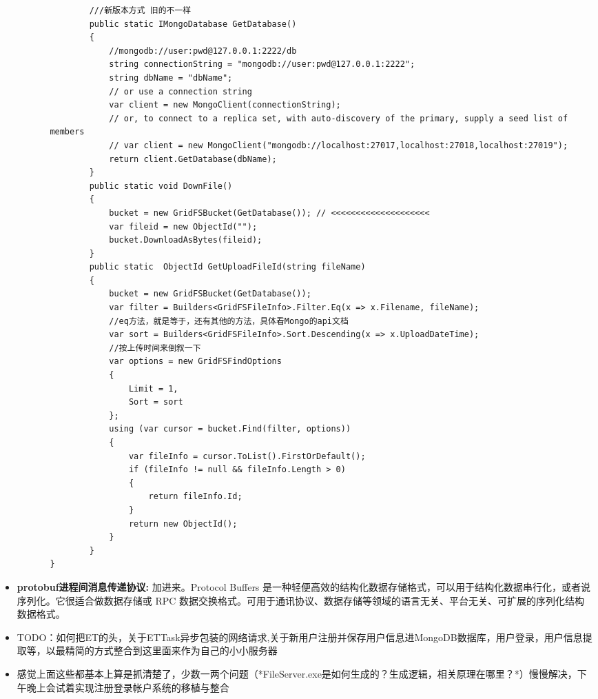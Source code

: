 \documentclass[9pt, b5paper]{article}
\begin{document}
\begin{itemize}
\begin{itemize}
\begin{itemize}
\begin{verbatim}
        ///新版本方式 旧的不一样
        public static IMongoDatabase GetDatabase()
        {
            //mongodb://user:pwd@127.0.0.1:2222/db
            string connectionString = "mongodb://user:pwd@127.0.0.1:2222";
            string dbName = "dbName";
            // or use a connection string
            var client = new MongoClient(connectionString);
            // or, to connect to a replica set, with auto-discovery of the primary, supply a seed list of members
            // var client = new MongoClient("mongodb://localhost:27017,localhost:27018,localhost:27019");
            return client.GetDatabase(dbName);
        }
        public static void DownFile()
        {
            bucket = new GridFSBucket(GetDatabase()); // <<<<<<<<<<<<<<<<<<<< 
            var fileid = new ObjectId("");
            bucket.DownloadAsBytes(fileid);
        }
        public static  ObjectId GetUploadFileId(string fileName)
        {
            bucket = new GridFSBucket(GetDatabase());
            var filter = Builders<GridFSFileInfo>.Filter.Eq(x => x.Filename, fileName);
            //eq方法，就是等于，还有其他的方法，具体看Mongo的api文档
            var sort = Builders<GridFSFileInfo>.Sort.Descending(x => x.UploadDateTime);
            //按上传时间来倒叙一下
            var options = new GridFSFindOptions
            {
                Limit = 1,
                Sort = sort
            };
            using (var cursor = bucket.Find(filter, options))
            {
                var fileInfo = cursor.ToList().FirstOrDefault();
                if (fileInfo != null && fileInfo.Length > 0)
                {
                    return fileInfo.Id;
                }
                return new ObjectId();
            }
        }
}
\end{verbatim}
\end{itemize}
\end{itemize}
\item \textbf{protobuf进程间消息传递协议:} 加进来。Protocol Buffers 是一种轻便高效的结构化数据存储格式，可以用于结构化数据串行化，或者说序列化。它很适合做数据存储或 RPC 数据交换格式。可用于通讯协议、数据存储等领域的语言无关、平台无关、可扩展的序列化结构数据格式。
\item TODO：如何把ET的头，关于ETTask异步包装的网络请求,关于新用户注册并保存用户信息进MongoDB数据库，用户登录，用户信息提取等，以最精简的方式整合到这里面来作为自己的小小服务器
\item 感觉上面这些都基本上算是抓清楚了，少数一两个问题（*FileServer.exe是如何生成的？生成逻辑，相关原理在哪里？*）慢慢解决，下午晚上会试着实现注册登录帐户系统的移植与整合
\end{itemize}
\end{document}

